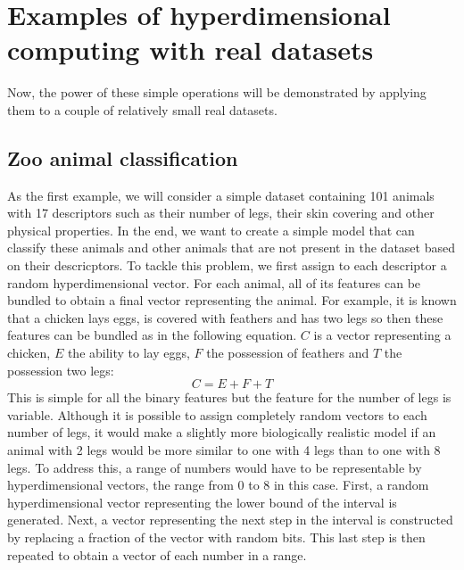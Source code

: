 \section{Examples of hyperdimensional computing with real datasets}
\label{sec:example}
Now, the power of these simple operations will be demonstrated by applying them to a couple of relatively small real datasets.
\subsection*{Zoo animal classification}
As the first example, we will consider a simple dataset\cite{zoo} containing 101 animals with 17 descriptors such as their number of legs, their skin covering and other physical properties. In the end, we want to create a simple model that can classify these animals and other animals that are not present in the dataset based on their descricptors. To tackle this problem, we first assign to each descriptor a random hyperdimensional vector. For each animal, all of its features can be bundled to obtain a final vector representing the animal. For example, it is known that a chicken lays eggs, is covered with feathers and has two legs so then these features can be bundled as in the following equation. $C$ is a vector representing a chicken, $E$ the ability to lay eggs, $F$ the possession of feathers and $T$ the possession two legs:
\begin{equation}\label{eqn:chicken}
    C = E + F + T
\end{equation}
This is simple for all the binary features but the feature for the number of legs is variable. Although it is possible to assign completely random vectors to each number of legs, it would make a slightly more biologically realistic model if an animal with 2 legs would be more similar to one with 4 legs than to one with 8 legs. To address this, a range of numbers would have to be representable by hyperdimensional vectors, the range from 0 to 8 in this case. First, a random hyperdimensional vector representing the lower bound of the interval is generated. Next, a vector representing the next step in the interval is constructed by replacing a fraction of the vector with random bits. This last step is then repeated to obtain a vector of each number in a range.


